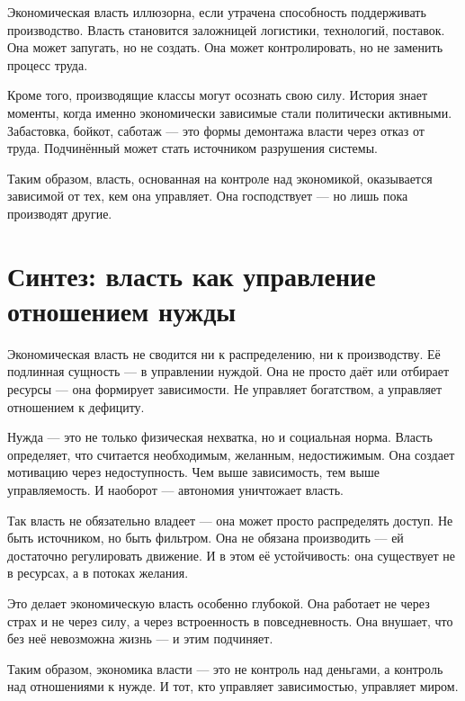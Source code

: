 Экономическая власть иллюзорна, если утрачена способность поддерживать производство. Власть становится заложницей логистики, технологий, поставок. Она может запугать, но не создать. Она может контролировать, но не заменить процесс труда.

Кроме того, производящие классы могут осознать свою силу. История знает моменты, когда именно экономически зависимые стали политически активными. Забастовка, бойкот, саботаж — это формы демонтажа власти через отказ от труда. Подчинённый может стать источником разрушения системы.

Таким образом, власть, основанная на контроле над экономикой, оказывается зависимой от тех, кем она управляет. Она господствует — но лишь пока производят другие.

\section{Синтез: власть как управление отношением нужды}

Экономическая власть не сводится ни к распределению, ни к производству. Её подлинная сущность — в управлении нуждой. Она не просто даёт или отбирает ресурсы — она формирует зависимости. Не управляет богатством, а управляет отношением к дефициту.

Нужда — это не только физическая нехватка, но и социальная норма. Власть определяет, что считается необходимым, желанным, недостижимым. Она создает мотивацию через недоступность. Чем выше зависимость, тем выше управляемость. И наоборот — автономия уничтожает власть.

Так власть не обязательно владеет — она может просто распределять доступ. Не быть источником, но быть фильтром. Она не обязана производить — ей достаточно регулировать движение. И в этом её устойчивость: она существует не в ресурсах, а в потоках желания.

Это делает экономическую власть особенно глубокой. Она работает не через страх и не через силу, а через встроенность в повседневность. Она внушает, что без неё невозможна жизнь — и этим подчиняет.

Таким образом, экономика власти — это не контроль над деньгами, а контроль над отношениями к нужде. И тот, кто управляет зависимостью, управляет миром.
